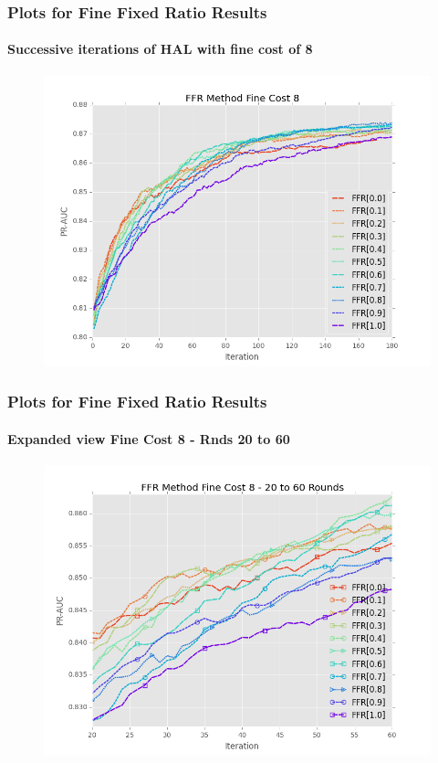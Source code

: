 \documentclass{beamer}
\begin{document}
\begin{frame}
    \frametitle{Plots for Fine Fixed Ratio Results}  %
    \framesubtitle{Successive iterations of HAL with fine cost of 8}
    \begin{figure}[!htb]
        \centering
        \includegraphics[width=0.8\columnwidth]{fig/ParamsFFR_PR_Cost8_rnds0_180}
        \label{fig:ParamsFFR_PR_Cost8_rnds0_180}
    \end{figure}
\end{frame}
\begin{frame}
    \frametitle{Plots for Fine Fixed Ratio Results}  %
    \framesubtitle{Expanded view Fine Cost 8 - Rnds 20 to 60}
    \begin{figure}[!htb]
        \centering
        \includegraphics[width=0.8\columnwidth]{fig/ParamsFFR_PR_Cost8_rnds20_60}
        \label{fig:ParamsFFR_PR_Cost8_rnds20_60}
    \end{figure}
\end{frame}
\end{document}
